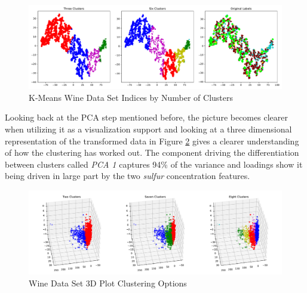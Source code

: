 


\begin{figure}[H]
\begin{center}
\includegraphics[width=1.0\textwidth]{images/kmeans_wine_tsne.pdf}
\end{center}
\caption{K-Means Wine Data Set Indices by Number of Clusters}
\label{fig:kmeans_wine_tsne}
\end{figure}

Looking back at the PCA step mentioned before, the picture becomes clearer when utilizing it as a visualization support and looking at a three dimensional representation of the transformed data in Figure \ref{fig:kmeans_wine_3d_multi} gives a clearer understanding of how the clustering has worked out. The component driving the differentiation between clusters called \textit{PCA 1} captures 94\% of the variance and loadings show it being driven in large part by the two \textit{sulfur} concentration features.

\begin{figure}[H]
\centering
\includegraphics[width=1.0\textwidth]{images/kmeans_wine_3d_multi.pdf}
\caption{Wine Data Set 3D Plot Clustering Options}
\label{fig:kmeans_wine_3d_multi}
\end{figure}

